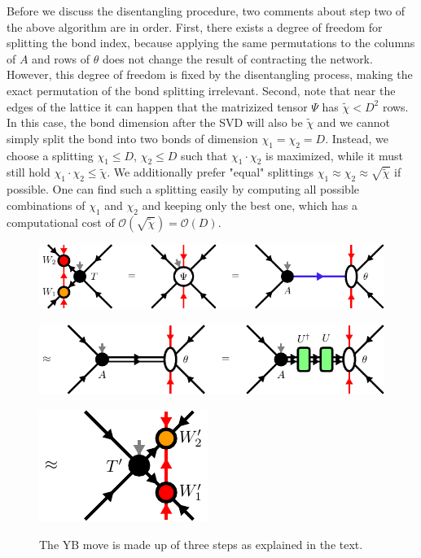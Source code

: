 Before we discuss the disentangling procedure, two comments about step two of the above algorithm are in order. First, there exists a degree of freedom for splitting the bond index, because applying the same permutations to the columns of $A$ and rows of $\theta$ does not change the result of contracting the network. However, this degree of freedom is fixed by the disentangling process, making the exact permutation of the bond splitting irrelevant. Second, note that near the edges of the lattice it can happen that the matrizized tensor $\Psi$ has $\tilde{\chi} < D^2$ rows. In this case, the bond dimension after the SVD will also be $\tilde{\chi}$ and we cannot simply split the bond into two bonds of dimension $\chi_1=\chi_2=D$. Instead, we choose a splitting $\chi_1 \le D$, $\chi_2 \le D$ such that $\chi_1\cdot\chi_2$ is maximized, while it must still hold $\chi_1\cdot\chi_2\le\tilde{\chi}$. We additionally prefer "equal" splittings $\chi_1\approx\chi_2\approx\sqrt{\tilde{\chi}}$ if possible. One can find such a splitting easily by computing all possible combinations of $\chi_1$ and $\chi_2$ and keeping only the best one, which has a computational cost of $\mathcal{O}\left(\sqrt{\tilde{\chi}}\right) = \mathcal{O}\left(D\right)$. \par
\begin{figure}
	\centering
	\subcaptionbox{\label{fig:yb_move_svd_disent_a}}
	{%
		\includegraphics[scale=1.0]{figures/tikz/disoTPS/yang_baxter_move_svd/yang_baxter_move_svd_a.pdf}
	}
	\par\bigskip
	\subcaptionbox{\label{fig:yb_move_svd_disent_b}}
	{%
		\includegraphics[scale=1.0]{figures/tikz/disoTPS/yang_baxter_move_svd/yang_baxter_move_svd_b.pdf}
	}
	\par\bigskip
	\subcaptionbox{\label{fig:yb_move_svd_disent_c}}
	{%
		\includegraphics[scale=1.0]{figures/tikz/disoTPS/yang_baxter_move_svd/yang_baxter_move_svd_c.pdf}
	}
	\caption{The YB move is made up of three steps as explained in the text.}
	\label{fig:yb_move_svd_disent}
\end{figure}
